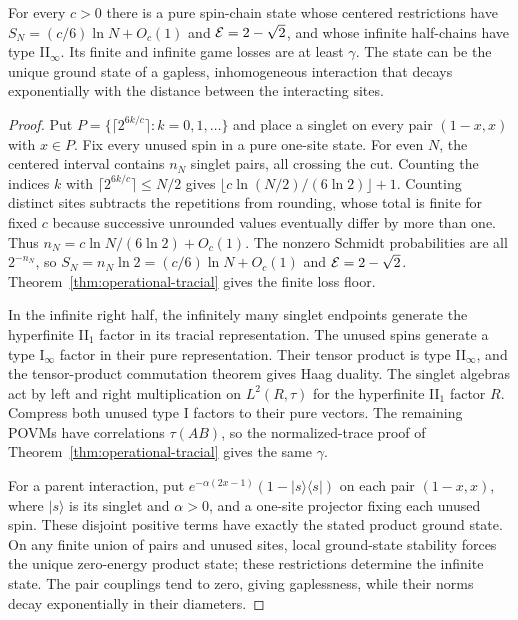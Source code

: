 \begin{theorem}\label{thm:entropy}
For every $c>0$ there is a pure spin-chain state whose centered restrictions
have $S_N=(c/6)\ln N+O_c(1)$ and $\mathcal{E}=2-\sqrt2$, and whose infinite
half-chains have type II$_\infty$. Its finite and infinite game losses are
at least $\gamma$. The state can be the unique ground state of a gapless,
inhomogeneous interaction that decays exponentially with the distance
between the interacting sites.
\end{theorem}
\begin{proof}
Put $P=\{\lceil2^{6k/c}\rceil:k=0,1,\ldots\}$ and place a singlet on every
pair $(1-x,x)$ with $x\in P$. Fix every unused spin in a pure one-site state.
For even $N$, the centered interval contains $n_N$ singlet pairs,
all crossing the cut. Counting the indices $k$ with
$\lceil2^{6k/c}\rceil\le N/2$ gives
$\lfloor c\ln(N/2)/(6\ln2)\rfloor+1$. Counting distinct sites
subtracts the repetitions from rounding, whose total is finite for
fixed $c$ because successive unrounded values eventually differ by
more than one. Thus $n_N=c\ln N/(6\ln2)+O_c(1)$.
The nonzero Schmidt probabilities are all $2^{-n_N}$, so
$S_N=n_N\ln2=(c/6)\ln N+O_c(1)$ and $\mathcal{E}=2-\sqrt2$.
Theorem~\ref{thm:operational-tracial} gives the finite loss floor.

In the infinite right half, the infinitely many singlet endpoints generate
the hyperfinite II$_1$ factor in its tracial representation. The unused
spins generate a type I$_\infty$ factor in their pure representation.
Their tensor product is type II$_\infty$, and the tensor-product
commutation theorem gives Haag duality. The singlet algebras act by left and right multiplication on
$L^2(R,\tau)$ for the hyperfinite II$_1$ factor $R$.
Compress both unused type I factors to their pure vectors. The remaining
POVMs have correlations $\tau(AB)$, so the normalized-trace proof of
Theorem~\ref{thm:operational-tracial} gives the same $\gamma$.

For a parent interaction, put
$e^{-\alpha(2x-1)}(1-|s\rangle\langle s|)$ on each pair $(1-x,x)$,
where $|s\rangle$ is its singlet and $\alpha>0$, and a one-site projector
fixing each unused spin. These disjoint positive terms have exactly the
stated product ground state. On any finite union of pairs and unused
sites, local ground-state stability forces the unique zero-energy
product state; these restrictions determine the infinite state. The pair couplings tend to zero, giving
gaplessness, while their norms decay exponentially in their diameters.
\end{proof}

